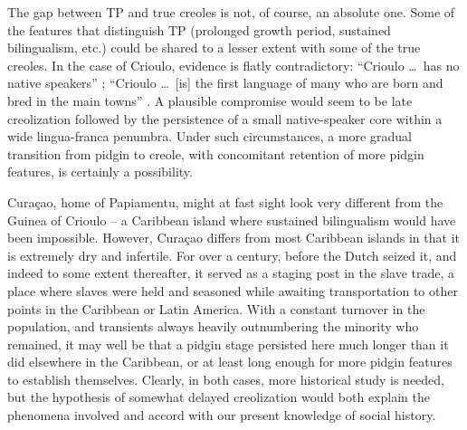 The gap between TP and true creoles is not, of course, an abso\-lute one. Some of the features that distinguish TP (prolonged growth period, sustained bilingualism, etc.) could be shared to a lesser extent with some of the true creoles. In the case of Crioulo, evidence is flatly contradictory: ``Crioulo \ldots~has no native speakers'' \citep{Alleyne1979}; ``Crioulo \ldots~[is] the first language of many who are born and bred in the main towns'' \citep[vii]{Wilson1962}. A plausible compromise would seem to be late creolization followed by the persistence of a small native-speaker core within a wide lingua-franca penumbra. Under such circumstances, a more gradual transition from pidgin to creole, with concomitant retention of more pidgin features, is certainly a possibility. 

Curaçao, home of Papiamentu, might at fast sight look very different from the Guinea of Crioulo -- a Caribbean island where sustained bilingualism would have been impossible. However, Curaçao differs from most Caribbean islands in that it is extremely dry and infertile. For over a century, before the Dutch seized it, and indeed to some extent thereafter, it served as a staging post in the slave trade, a place where slaves were held and seasoned while awaiting trans\-portation to other points in the Caribbean or Latin America. With a constant turnover in the population, and transients always heavily outnumbering the minority who remained, it may well be that a pidgin stage persisted here much longer than it did elsewhere in the Caribbean, or at least long enough for more pidgin features to establish themselves. Clearly, in both cases, more historical study is needed, but the hypothe\-sis of somewhat delayed creolization would both explain the phe\-nomena involved and accord with our present knowledge of social history.


